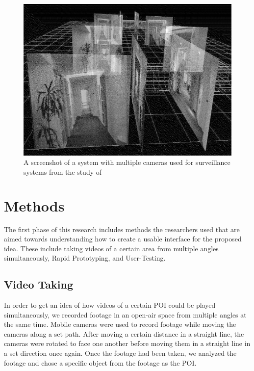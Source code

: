 \documentclass{sigchi}
\begin{document}
\begin{figure}[t]
    \centering
    \includegraphics[width = 1\linewidth]{figures/multipleangle.png}
    \caption{A screenshot of a system with multiple cameras used for surveillance systems from the study of \cite{zhou2011system}}
    \label{fig:multiple}
\end{figure}
\section{Methods}
The first phase of this research includes methods the researchers used that are aimed towards understanding how to create a usable interface for the proposed idea. These include taking videos of a certain area from multiple angles simultaneously, Rapid Prototyping, and User-Testing. 

\subsection{Video Taking}
In order to get an idea of how videos of a certain POI could be played simultaneously, we recorded footage in an open-air space from multiple angles at the same time. Mobile cameras were used to record footage while moving the cameras along a set path. After moving a certain distance in a straight line, the cameras were rotated to face one another before moving them in a straight line in a set direction once again. Once the footage had been taken, we analyzed the footage and chose a specific object from the footage as the POI. 
\end{document}
